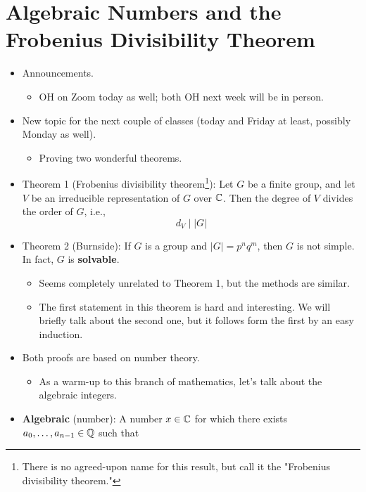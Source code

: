 \documentclass[../notes.tex]{subfiles}
\begin{document}
\section{Algebraic Numbers and the Frobenius Divisibility Theorem}
\begin{itemize}
    \item {}Announcements.
    \begin{itemize}
        \item OH on Zoom today as well; both OH next week will be in person.
    \end{itemize}
    \item New topic for the next couple of classes (today and Friday at least, possibly Monday as well).
    \begin{itemize}
        \item Proving two wonderful theorems.
    \end{itemize}
    \item Theorem 1 (Frobenius divisibility theorem\footnote{There is no agreed-upon name for this result, but \textcite{bib:FultonHarris} call it the "Frobenius divisibility theorem."}): Let $G$ be a finite group, and let $V$ be an irreducible representation of $G$ over $\mathbb{C}$. Then the degree of $V$ divides the order of $G$, i.e.,
    \begin{equation*}
        d_V \mid |G|
    \end{equation*}
    \item Theorem 2 (Burnside): If $G$ is a group and $|G|=p^nq^m$, then $G$ is not simple. In fact, $G$ is \textbf{solvable}.
    \begin{itemize}
        \item Seems completely unrelated to Theorem 1, but the methods are similar.
        \item The first statement in this theorem is hard and interesting. We will briefly talk about the second one, but it follows form the first by an easy induction.
    \end{itemize}
    \item Both proofs are based on number theory.
    \begin{itemize}
        \item As a warm-up to this branch of mathematics, let's talk about the algebraic integers.
    \end{itemize}
    \item \textbf{Algebraic} (number): A number $x\in\mathbb{C}$ for which there exists $a_0,\dots,a_{n-1}\in\mathbb{Q}$ such that
    \begin{equation*}

\end{equation*}
\end{itemize}
\end{document}
